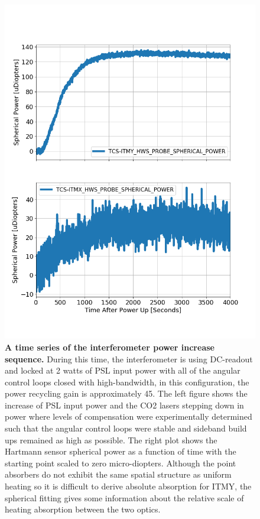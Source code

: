 \begin{figure}[t!]
		\includegraphics[width=0.35\textheight]{../Figures/1231726400HWS_powerup.png}
		\caption[A time series of the interferometer power increase sequence.] 
		{\textbf{A time series of the interferometer power increase sequence.} During this time, the interferometer is using DC-readout and locked at 2 watts of PSL input power with all of the angular control loops closed with high-bandwidth, in this configuration, the power recycling gain is approximately 45.  The left figure shows the increase of PSL input power and the CO2 lasers stepping down in power where levels of compensation were experimentally determined such that the angular control loops were stable and sideband build ups remained as high as possible.  The right plot shows the Hartmann sensor spherical power as a function of time with the starting point scaled to zero micro-diopters.  Although the point absorbers do not exhibit the same spatial structure as uniform heating so it is difficult to derive absolute absorption for ITMY, the spherical fitting gives some information about the relative scale of heating absorption between the two optics.}
		\label{fig:pwr_up_time}
	\end{figure}
	
